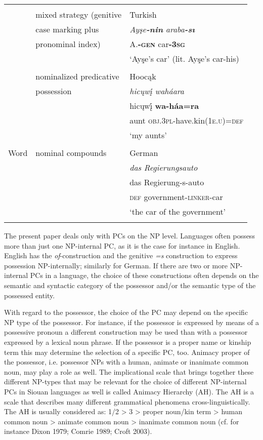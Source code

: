 \documentclass[output=paper]{LSP/langsci}
\begin{document}
\begin{table}
\begin{tabular}[h!]{l l l }
& \\
& mixed strategy (genitive & Turkish \citep[633]{Kornfilt1990} \\
& case marking plus &\textit{Ayşe\textbf{-nin} araba\textbf{-sı}} \\
& pronominal index) & 	A.\textbf{-\textsc{gen}}    car\textbf{-\textsc{3sg}} \\
& & `Ayşe's car' (lit. Ayşe's car-his) \\
& \\
& nominalized predicative  & Hooc\k{a}k \citep[19]{Helmbrecht2003} \\
& possession & \textit{hicųwį́ waháara} \\
& & hicųwį́  \textbf{wa-háa=ra} \\
& & aunt      \textsc{obj.3pl}-have.kin(\textsc{1e.u})=\textsc{def} \\
& & `my aunts' \\
& \\
Word & nominal compounds & German \\
& & \textit{das Regierungsauto} \\
& & das Regierung-s-auto \\
& & \textsc{def} government-\textsc{linker}-car \\
& & `the car of the government' \\
\lspbottomrule
\end{tabular}
\end{table}

The present paper deals only with PCs on the NP level. Languages often possess more than just one NP-internal PC, as it is the case for instance in English. English has the \textit{of}-construction and the genitive \textit{=s} construction to express possession NP-internally; similarly for German. If there are two or more NP-internal PCs in a language, the choice of these constructions often depends on the semantic and syntactic category of the possessor and/or the semantic type of the possessed entity. 

With regard to the possessor, the choice of the PC may depend on the specific NP type of the possessor. For instance, if the possessor is expressed by means of a possessive pronoun a different construction may be used than with a possessor expressed by a lexical noun phrase. If the possessor is a proper name or kinship term this may determine the selection of a specific PC, too. Animacy proper of the possessor, i.e. possessor NPs with a human, animate or inanimate common noun, may play a role as well. The implicational scale that brings together these different NP-types that may be relevant for the choice of different NP-internal PCs in Siouan languages as well is called Animacy Hierarchy (AH). The AH is a scale that describes many different grammatical phenomena cross-linguistically. The AH is usually considered as: 1/2 > 3 > proper noun/kin term > human common noun > animate common noun > inanimate common noun (cf. for instance Dixon 1979; Comrie 1989; Croft 2003).
\end{document}
